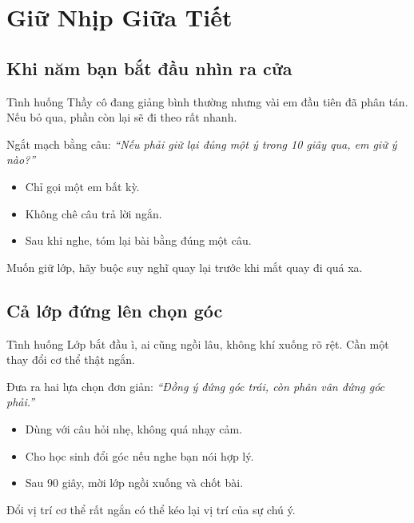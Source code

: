 \chapter{Giữ Nhịp Giữa Tiết}

\section{Khi năm bạn bắt đầu nhìn ra cửa}
\begin{tinhhuong}{Tình huống}
Thầy cô đang giảng bình thường nhưng vài em đầu tiên đã phân tán. Nếu bỏ qua, phần còn lại sẽ đi theo rất nhanh.
\end{tinhhuong}
\begin{goiydungngay}
Ngắt mạch bằng câu: \textit{``Nếu phải giữ lại đúng một ý trong 10 giây qua, em giữ ý nào?''}
\begin{itemize}
\item Chỉ gọi một em bất kỳ.
\item Không chê câu trả lời ngắn.
\item Sau khi nghe, tóm lại bài bằng đúng một câu.
\end{itemize}
\end{goiydungngay}
\begin{cauchot}
Muốn giữ lớp, hãy buộc suy nghĩ quay lại trước khi mắt quay đi quá xa.
\end{cauchot}
\ngancach

\section{Cả lớp đứng lên chọn góc}
\begin{tinhhuong}{Tình huống}
Lớp bắt đầu ì, ai cũng ngồi lâu, không khí xuống rõ rệt. Cần một thay đổi cơ thể thật ngắn.
\end{tinhhuong}
\begin{goiydungngay}
Đưa ra hai lựa chọn đơn giản: \textit{``Đồng ý đứng góc trái, còn phân vân đứng góc phải.''}
\begin{itemize}
\item Dùng với câu hỏi nhẹ, không quá nhạy cảm.
\item Cho học sinh đổi góc nếu nghe bạn nói hợp lý.
\item Sau 90 giây, mời lớp ngồi xuống và chốt bài.
\end{itemize}
\end{goiydungngay}
\begin{cauchot}
Đổi vị trí cơ thể rất ngắn có thể kéo lại vị trí của sự chú ý.
\end{cauchot}
\ngancach

